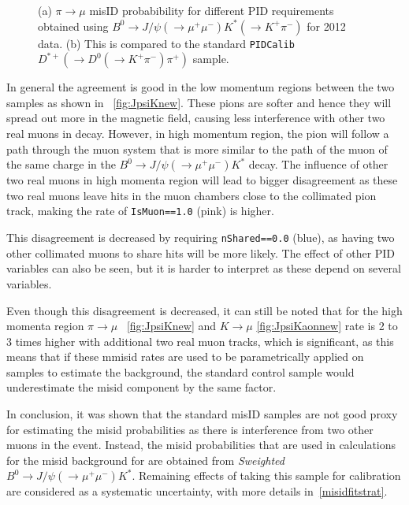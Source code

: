 \begin{figure}[h!]
		\caption{(a) $\pi \rightarrow \mu$ misID probabibility for different PID requirements obtained using $B^{0} \rightarrow J/\psi(\rightarrow \mu^{+} \mu^{-}) K^{*} (\rightarrow {K^{+} \pi^{-}} )$ for 2012 data. (b) This is compared to the standard \texttt{PIDCalib} $D^{*+}(\rightarrow D^{0}(\rightarrow K^{+} \pi^{-}) \pi^{+})$ sample. }
		\label{fig:JpsiKnew}
\end{figure}

In general the agreement is good in the low momentum regions between the two samples as shown in ~\autoref{fig:JpsiKnew}. These pions are softer and hence they will spread out more in the magnetic field, causing less interference with other two real muons in decay. However, in high momentum region, the pion will follow a path through the muon system that is more similar to the path of the muon of the same charge in the $B^{0} \rightarrow J/\psi(\rightarrow \mu^{+} \mu^{-}) K^{*}$ decay. The influence of other two real muons in high momenta region will lead to bigger disagreement as these two real muons leave hits in the muon chambers close to the collimated pion track, making the rate of \texttt{IsMuon==1.0} (pink) is higher. 

This disagreement is decreased by requiring \texttt{nShared==0.0} (blue), as having two other collimated muons to share hits will be more likely. The effect of other \gls{PID} variables can also be seen, but it is harder to interpret as these depend on several variables.

Even though this disagreement is decreased, it can still be noted that for the high momenta region $\pi \rightarrow \mu$ ~\autoref{fig:JpsiKnew} and $K \rightarrow \mu$ \autoref{fig:JpsiKaonnew} rate is 2 to 3 times higher with additional two real muon tracks, which is significant, as this means that if these mmisid rates are used to be parametrically applied on samples to estimate the background, the standard control sample would underestimate the misid component by the same factor.

In conclusion, it was shown that the standard misID samples are not good proxy for estimating the misid probabilities as there is interference from two other muons in the event. Instead, the misid probabilities that are used in calculations for the misid background for \Bmumumu are obtained from \textit{Sweighted} $B^{0} \rightarrow J/\psi(\rightarrow \mu^{+} \mu^{-}) K^{*}$. Remaining effects of taking this sample for calibration are considered as a systematic uncertainty, with more details in~\autoref{misidfitstrat}.



